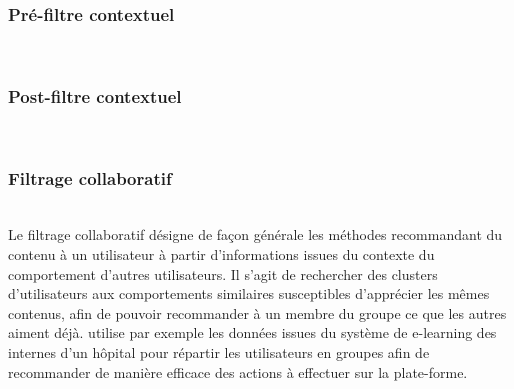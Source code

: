 \documentclass[conference]{./sty/IEEEtran}
\begin{document}
\subsubsection{Pré-filtre contextuel}
~\\

\subsubsection{Post-filtre contextuel}
~\\

\subsubsection{Filtrage collaboratif}
~\\Le filtrage collaboratif désigne de façon générale les méthodes recommandant du contenu à un utilisateur à partir d'informations issues du contexte du comportement d'autres utilisateurs. Il s'agit de rechercher des clusters d'utilisateurs aux comportements similaires susceptibles d'apprécier les mêmes contenus, afin de pouvoir recommander à un membre du groupe ce que les autres aiment déjà. \cite{Liou:2014:CPL:2617848.2617854} utilise par exemple les données issues du système de  e-learning des internes d'un hôpital pour répartir les utilisateurs en groupes afin de recommander de manière efficace des actions à effectuer sur la plate-forme. 
\end{document}
